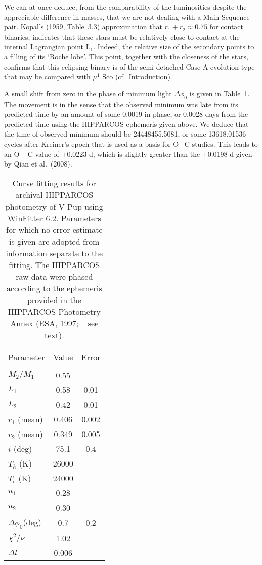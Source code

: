\documentclass[useAMS,usenatbib]{mnras}                                                                           \usepackage[pdftex]{graphicx}
\begin{document}
We can at once deduce, from the comparability of the luminosities
despite the appreciable difference in masses, that we are not dealing with a Main Sequence pair.   
Kopal's (1959, Table~3.3) approximation that $r_1 + r_2 \approx 0.75$ for 
contact binaries, indicates that these stars
must be relatively close to contact at the internal Lagrangian point L$_1$.
Indeed, the relative size of the secondary points to a filling of its `Roche lobe'.
This point, together with the closeness of the stars, confirms that
this eclipsing binary is of the semi-detached Case-A-evolution type that may be compared with 
$\mu^1$ Sco (cf.\ Introduction). 

A small shift from zero in the phase of minimum light $\Delta \phi_0$ is given in 
Table~1. The movement is in the sense that the observed minimum was late from
 its predicted time by an amount of some 0.0019 in phase, or 0.0028 days from the predicted time
using the HIPPARCOS ephemeris given above.  We deduce that the time of observed minimum 
should be 24448455.5081, or some 13618.01536 cycles after Kreiner's epoch
that is used as a basis for O --C studies.
This leads to an O -- C value of +0.0223 d, which is slightly greater than
the +0.0198 d given by Qian et al.\ (2008).
  
 
\begin{table}
\begin{center}
\caption{Curve fitting results for archival HIPPARCOS 
photometry of V Pup using {\sc WinFitter 6.2}.
Parameters for which no error estimate is given are adopted from
information separate to the fitting.
The HIPPARCOS raw data were phased according to the ephemeris
provided in the HIPPARCOS Photometry Annex (ESA, 1997; -- see text).}
\begin{tabular}{lcc}
   \hline  \\
\multicolumn{1}{c}{Parameter}  & \multicolumn{1}{c}{Value} & 
\multicolumn{1}{c}{Error}\\
\hline \\
$M_2/M_1$ & 0.55 & \\
$L_1$ & 0.58 & 0.01 \\
$L_2$ & 0.42 & 0.01 \\
$r_1$ (mean) & 0.406 & 0.002\\
$r_2$ (mean) & 0.349 & 0.005 \\
$i$ (deg) & 75.1 & 0.4 \\
$T_h$ (K) & 26000 & \\
$T_c$ (K) & 24000 & \\
$u_1$ & 0.28 &\\
$u_2$ & 0.30 &\\
$\Delta\phi_0$(deg) &0.7 & 0.2 \\
$\chi^2/\nu$ & 1.02 & \\
$\Delta l $& 0.006  &\\
\hline
\end{tabular}
\end{center}
\end{table}
 
\end{document}
